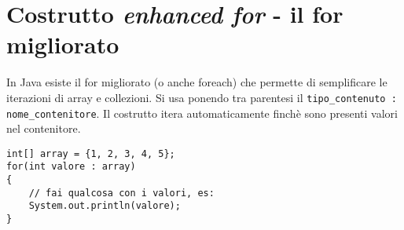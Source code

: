 \section{Costrutto \textit{enhanced for} - il for migliorato}
In Java esiste il for migliorato (o anche foreach) che permette di semplificare le iterazioni di array e collezioni. Si usa ponendo tra parentesi il \texttt{tipo\_contenuto : nome\_contenitore}. Il costrutto itera automaticamente finchè sono presenti valori nel contenitore.

\begin{lstlisting}
int[] array = {1, 2, 3, 4, 5};
for(int valore : array)
{
	// fai qualcosa con i valori, es:
	System.out.println(valore);
}
\end{lstlisting}